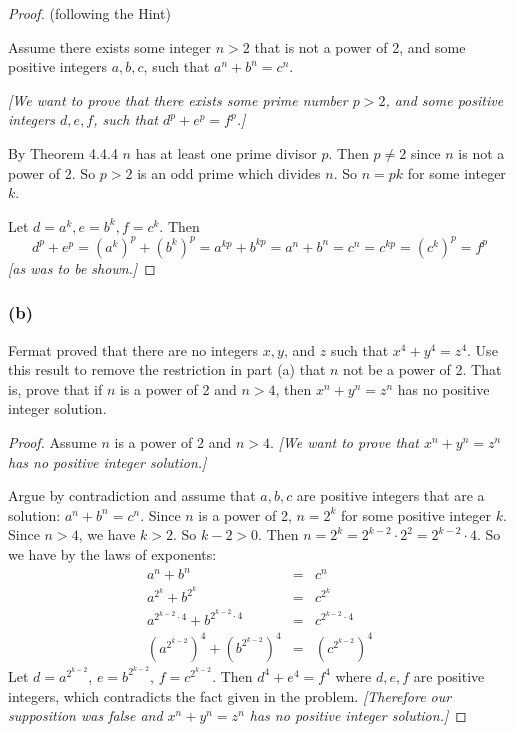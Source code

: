\documentclass[14pt]{extarticle}
\begin{document}
\begin{proof}
    (following the Hint)

    Assume there exists some integer $n > 2$ that is not a power of 2, and some positive integers $a,b,c$, such that $a^n + b^n = c^n$.

        {\it [We want to prove that there exists some prime number $p > 2$, and some positive integers $d,e,f$, such that $d^p + e^p = f^p$.]}

    By Theorem 4.4.4 $n$ has at least one prime divisor $p$. Then $p \neq 2$ since $n$ is not a power of 2. So $p > 2$ is an odd prime which divides $n$. So $n = pk$ for some integer $k$.

    Let $d = a^k, e = b^k, f = c^k$. Then
    \[
        d^p + e^p = (a^k)^p + (b^k)^p = a^{kp} + b^{kp} = a^n + b^n = c^n = c^{kp} = (c^k)^p = f^p
    \]
    {\it [as was to be shown.]}
\end{proof}

\subsubsection{(b)}
Fermat proved that there are no integers $x, y$, and $z$ such that $x^4 + y^4 = z^4$. Use this result to remove the restriction in part (a) that $n$ not be a power of 2. That is, prove that if $n$ is a power of 2 and $n > 4$, then $x^n + y^n = z^n$ has no positive integer solution.

\begin{proof}
    Assume $n$ is a power of 2 and $n > 4$. {\it [We want to prove that $x^n + y^n = z^n$ has no positive integer solution.]}

    Argue by contradiction and assume that $a,b,c$ are positive integers that are a solution: $a^n + b^n = c^n$. Since $n$ is a power of 2, $n = 2^k$ for some positive integer $k$. Since $n > 4$, we have $k > 2$. So $k-2 > 0$. Then $n = 2^k = 2^{k-2} \cdot 2^2 = 2^{k-2} \cdot 4$. So we have by the laws of exponents:
    \[
        \begin{array}{ccc}
            a^n + b^n                                               & = & c^n                        \\
            a^{2^k} + b^{2^k}                                       & = & c^{2^k}                    \\
            a^{2^{k-2}\cdot 4} + b^{2^{k-2}\cdot 4}                 & = & c^{2^{k-2}\cdot 4}         \\
            \left(a^{2^{k-2}}\right)^4 + \left(b^{2^{k-2}}\right)^4 & = & \left(c^{2^{k-2}}\right)^4
        \end{array}
    \]
    Let $d = a^{2^{k-2}}$, $e = b^{2^{k-2}}$, $f = c^{2^{k-2}}$. Then $d^4 + e^4 = f^4$ where $d,e,f$ are positive integers, which contradicts the fact given in the problem. {\it [Therefore our supposition was false and $x^n + y^n = z^n$ has no positive integer solution.]}
\end{proof}
\end{document}
